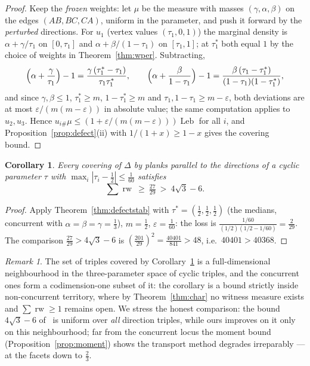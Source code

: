 \documentclass[11pt,reqno]{amsart}
\theoremstyle{plain}
\newtheorem{corollary}[theorem]{Corollary}
\theoremstyle{definition}
\theoremstyle{remark}
\newtheorem{remark}[theorem]{Remark}
\newcommand{\rw}{\operatorname{rw}}
\newcommand{\Leb}{\operatorname{Leb}}
\begin{document}
\begin{proof}
Keep the \emph{frozen} weights: let $\mu$ be the measure with masses
$(\gamma,\alpha,\beta)$ on the edges $(AB,BC,CA)$, uniform in the parameter, and
push it forward by the \emph{perturbed} directions. For $u_1$ (vertex values
$(\tau_1,0,1)$) the marginal density is $\alpha+\gamma/\tau_1$ on $[0,\tau_1]$
and $\alpha+\beta/(1-\tau_1)$ on $[\tau_1,1]$; at $\tau_1^*$ both equal $1$ by
the choice of weights in Theorem~\ref{thm:wper}. Subtracting,
\[
\Bigl(\alpha+\frac{\gamma}{\tau_1}\Bigr)-1
=\frac{\gamma\,(\tau_1^*-\tau_1)}{\tau_1\tau_1^*},\qquad
\Bigl(\alpha+\frac{\beta}{1-\tau_1}\Bigr)-1
=\frac{\beta\,(\tau_1-\tau_1^*)}{(1-\tau_1)(1-\tau_1^*)},
\]
and since $\gamma,\beta\le1$, $\tau_1^*\ge m$, $1-\tau_1^*\ge m$ and
$\tau_1,1-\tau_1\ge m-\varepsilon$, both deviations are at most
$\varepsilon/(m(m-\varepsilon))$ in absolute value; the same computation applies
to $u_2,u_3$. Hence $u_{i\#}\mu\le(1+\varepsilon/(m(m-\varepsilon)))\Leb$ for
all $i$, and Proposition~\ref{prop:defect}(ii) with
$1/(1+x)\ge1-x$ gives the covering bound.
\end{proof}

\begin{corollary}\label{cor:beyond}
Every covering of $\Delta$ by planks parallel to the directions of a cyclic
parameter $\tau$ with $\max_i|\tau_i-\tfrac12|\le\tfrac1{60}$ satisfies
\[
\sum\rw\ \ge\ \tfrac{27}{29}\ >\ 4\sqrt3-6 .
\]
\end{corollary}

\begin{proof}
Apply Theorem~\ref{thm:defectstab} with $\tau^*=(\tfrac12,\tfrac12,\tfrac12)$
(the medians, concurrent with $\alpha=\beta=\gamma=\tfrac13$), $m=\tfrac12$,
$\varepsilon=\tfrac1{60}$: the loss is
$\frac{1/60}{(1/2)(1/2-1/60)}=\tfrac2{29}$. The comparison
$\tfrac{27}{29}>4\sqrt3-6$ is $(\tfrac{201}{29})^2=\tfrac{40401}{841}>48$, i.e.\
$40401>40368$.
\end{proof}

\begin{remark}\label{rem:beyond}
The set of triples covered by Corollary~\ref{cor:beyond} is a full-dimensional
neighbourhood in the three-parameter space of cyclic triples, and the concurrent
ones form a codimension-one subset of it: the corollary is a bound strictly
inside non-concurrent territory, where by Theorem~\ref{thm:char} no witness
measure exists and $\sum\rw\ge1$ remains open. We stress the honest comparison:
the bound $4\sqrt3-6$ of~\cite{BY26} is uniform over \emph{all} direction
triples, while ours improves on it only on this neighbourhood; far from the
concurrent locus the moment bound (Proposition~\ref{prop:moment}) shows the
transport method degrades irreparably --- at the facets down to $\tfrac23$.
\end{remark}
\end{document}
